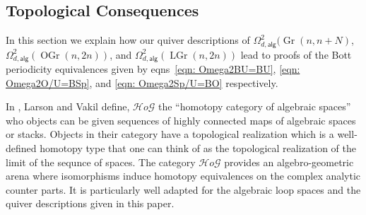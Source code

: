 \documentclass{amsart}
\theoremstyle{definition}
\newcommand{\HoG}{\mathcal{H}o\mathcal{G}}    %
\newcommand{\alg}{\mathsf{alg}}
\newcommand{\Gr}{\operatorname{Gr}}
\newcommand{\LGr}{\operatorname{LGr}}
\newcommand{\OGr}{\operatorname{OGr}}
\newcommand{\LoopTwo}{\Omega^{2}_{d,\alg}}
\begin{document}
\begin{center}
\end{center}



\subsection{Topological Consequences}\label{subsec: topological consequences}

In this section we explain how our quiver descriptions of $\LoopTwo
(\Gr (n,n+N)$, $\LoopTwo (\OGr(n,2n))$, and $\LoopTwo (\LGr(n,2n))$
lead to proofs of the Bott periodicity equivalences given by
eqns~\eqref{eqn: Omega2BU=BU}, \eqref{eqn: Omega2O/U=BSp}, and
\eqref{eqn: Omega2Sp/U=BO} respectively.

In \cite{Larson-Vakil-BottPeriodicity}, Larson and Vakil define,
$\HoG$ the ``homotopy category of algebraic spaces'' who objects can
be given sequences of highly connected maps of algebraic spaces or
stacks. Objects in their category have a topological realization which
is a well-defined homotopy type that one can think of as the
topological realization of the limit of the sequnce of spaces. The
category $\HoG$ provides an algebro-geometric arena where isomorphisms
induce homotopy equivalences on the complex analytic counter parts. It
is particularly well adapted for the algebraic loop spaces and the
quiver descriptions given in this paper.
\end{document}
